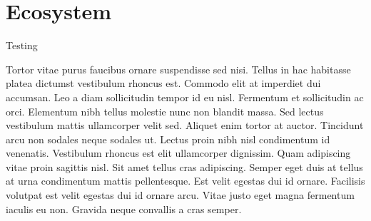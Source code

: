 \chapter{Ecosystem}

Testing

Tortor vitae purus faucibus ornare suspendisse sed nisi. Tellus in hac habitasse platea dictumst vestibulum rhoncus est. Commodo elit at imperdiet dui accumsan. Leo a diam sollicitudin tempor id eu nisl. Fermentum et sollicitudin ac orci. Elementum nibh tellus molestie nunc non blandit massa. Sed lectus vestibulum mattis ullamcorper velit sed. Aliquet enim tortor at auctor. Tincidunt arcu non sodales neque sodales ut. Lectus proin nibh nisl condimentum id venenatis. Vestibulum rhoncus est  elit ullamcorper dignissim. Quam adipiscing vitae proin sagittis nisl. Sit amet tellus cras adipiscing. Semper eget duis at tellus at urna condimentum mattis pellentesque. Est velit egestas dui id ornare. Facilisis volutpat est velit egestas dui id ornare arcu. Vitae justo eget magna fermentum iaculis eu non. Gravida neque convallis a cras semper.
